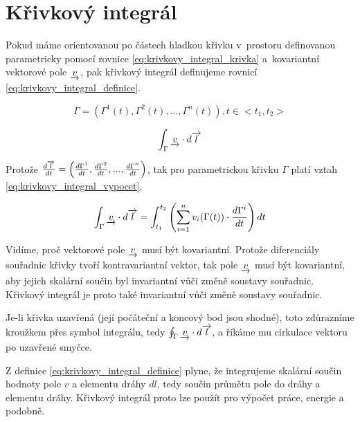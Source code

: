 \section{Křivkový integrál}

Pokud máme orientovanou po částech hladkou křivku v~prostoru definovanou parametricky pomocí rovnice \eqref{eq:krivkovy_integral_krivka} a~kovariantní vektorové pole \(\underrightarrow{v}\), pak křivkový integrál definujeme rovnicí \eqref{eq:krivkovy_integral_definice}.

\begin{equation}
\label{eq:krivkovy_integral_krivka}
\Gamma = (\Gamma^1(t), \Gamma^2(t), ..., \Gamma^n(t)), t \in <t_1, t_2>
\end{equation}

\begin{equation}
\label{eq:krivkovy_integral_definice}
\begin{split}
\int_\Gamma \underrightarrow{v} \cdot d\overrightarrow{l}
\end{split}
\end{equation}

Protože \(\frac{d\overrightarrow{l}}{dt} = \left(\frac{d \Gamma^1}{dt}, \frac{d \Gamma^2}{dt}, ..., \frac{d \Gamma^n}{dt} \right)\), tak pro parametrickou křivku
\(\Gamma\) platí vztah \eqref{eq:krivkovy_integral_vypocet}.

\begin{equation}
\label{eq:krivkovy_integral_vypocet}
\begin{split}
\int_\Gamma \underrightarrow{v} \cdot d\overrightarrow{l} =
\int_{t_1}^{t_2} \left(\sum_{i=1}^n v_i(\Gamma(t)) \cdot \frac{d \Gamma^i}{dt} \right) dt
\end{split}
\end{equation}

Vidíme, proč vektorové pole \(\underrightarrow{v}\) musí být kovariantní. Protože diferenciály souřadnic křivky tvoří kontravariantní vektor, tak pole \(\underrightarrow{v}\) musí být kovariantní, aby jejich skalární součin byl invariantní vůči změně soustavy souřadnic. Křivkový integrál je proto také invariantní vůči změně soustavy souřadnic.

Je-li křivka uzavřená (její počáteční a koncový bod jsou shodné), toto zdůrazníme kroužkem přes symbol integrálu, tedy \(\oint_\Gamma \underrightarrow{v} \cdot d\overrightarrow{l}\), a říkáme mu cirkulace vektoru po uzavřené smyčce.

Z definice \eqref{eq:krivkovy_integral_definice} plyne, že integrujeme skalární součin hodnoty pole \(v\) a elementu dráhy \(dl\),
tedy součin průmětu pole do dráhy a elementu dráhy. Křivkový integrál proto lze použít pro výpočet práce, energie a podobně.


